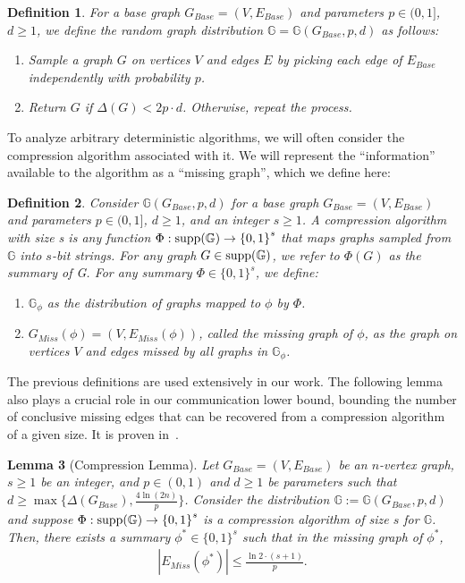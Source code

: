 \documentclass[11pt]{article}
\newtheorem{lemma}{Lemma}[section]
\newtheorem{definition}[lemma]{Definition}
\theoremstyle{definition}
\renewcommand{\leq}{\leqslant}
\renewcommand{\geq}{\geqslant}
\renewcommand{\le}{\leq}
\renewcommand{\ge}{\geq}
\newcommand{\supp}[1]{\ensuremath{\textnormal{\text{supp}}(#1)}}
\begin{document}
\begin{definition}
    For a base graph $G_{Base}=(V, E_{Base})$ and parameters $p\in (0, 1]$, $d\ge 1$, we define the random graph distribution $\mathbb{G}=\mathbb{G}(G_{Base}, p, d)$ as follows:
    \begin{enumerate}
        \item Sample a graph $G$ on vertices $V$ and edges $E$ by picking each edge of $E_{Base}$ independently with probability $p$. 
        \item Return $G$ if $\Delta{(G)}< 2p\cdot d$. Otherwise, repeat the process.
    \end{enumerate}
\end{definition}

To analyze arbitrary deterministic algorithms, we will often consider the compression algorithm associated with it. We will represent the ``information'' available to the algorithm as a ``missing graph'', which we define here:
\begin{definition}
    Consider $\mathbb{G}(G_{Base}, p, d)$ for a base graph $G_{Base}=(V, E_{Base})$ and parameters $p\in(0, 1]$, $d\ge 1$, and an integer $s\ge 1$. A compression algorithm with size s is any function $\Phi : \supp{\mathbb{G}} \rightarrow {\{0, 1\}}^s$ that maps graphs sampled from $\mathbb{G}$ into $s$-bit strings. For any graph $G\in \supp{\mathbb{G}}$, we refer to $\Phi(G)$ as the summary of G. For any summary $\Phi\in{\{0,1\}}^s$, we define:
    \begin{enumerate}
        \item $\mathbb{G}_{\phi}$ as the distribution of graphs mapped to $\phi$ by $\Phi$. 
        \item $G_{Miss}(\phi)=(V, E_{Miss}(\phi))$, called the missing graph of $\phi$, as the graph on vertices $V$ and edges missed by all graphs in $\mathbb{G}_{\phi}$. 
    \end{enumerate}
\end{definition}

The previous definitions are used extensively in our work. The following lemma also plays a crucial role in our communication lower bound, bounding the number of conclusive missing edges that can be recovered from a compression algorithm of a given size. It is proven in~\cite{assadi2022deterministic}.

\begin{lemma}[Compression Lemma]\label{compression}
Let $G_{Base}=(V, E_{Base})$ be an $n$-vertex graph, $s\ge 1$ be an integer, and $p\in (0, 1)$ and $d\ge 1$ be parameters such that $d\ge \max\{\Delta{(G_{Base})}, \frac {4\ln(2n)}p\}$. Consider the distribution $\mathbb{G}:=\mathbb{G}(G_{Base}, p, d)$ and suppose $\Phi:\supp{\mathbb{G}}\rightarrow {\{0, 1\}}^s$ is a compression algorithm of size $s$ for $\mathbb{G}$. Then, there exists a summary $\phi^*\in {\{0, 1\}}^s$ such that in the missing graph of $\phi^*$,
\begin{align*}
    |E_{Miss}(\phi^*)|\le \frac{\ln 2\cdot (s+1)}p.
\end{align*}
\end{lemma}
\end{document}
